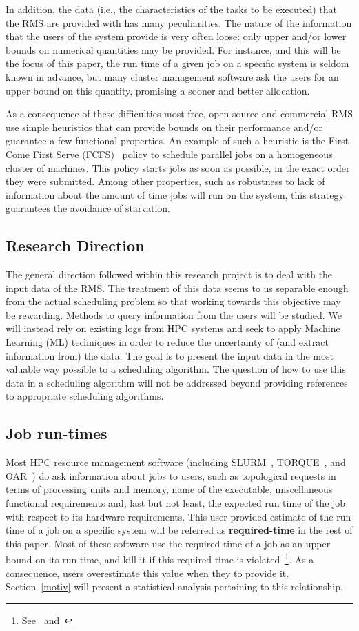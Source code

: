 \documentclass{article}
\begin{document}
In addition, the data (i.e., the characteristics of the tasks to be executed) that the RMS are provided with has many peculiarities.
The nature of the information that the users of the system provide is very often loose: only upper and/or lower bounds on numerical quantities may be provided.
For instance, and this will be the focus of this paper, the run time of a given job on a specific system is seldom known in advance, but many cluster management software ask the users for an upper bound on this quantity, promising a sooner and better allocation.

As a consequence of these difficulties most free, open-source and commercial RMS use simple heuristics that can provide bounds on their performance and/or guarantee a few functional properties.
An example of such a heuristic is the First Come First Serve (FCFS)~\cite{FCFS} policy to schedule parallel jobs on a homogeneous cluster of machines. This policy starts jobs as soon as possible, in the exact order they were submitted.
Among other properties, such as robustness to lack of information about the amount of time jobs will run on the system, this strategy guarantees the avoidance of starvation.

\subsection{Research Direction}
The general direction followed within this research project is to deal with the input data of the RMS.
The treatment of this data seems to us separable enough from the actual scheduling problem so that working towards this objective may be rewarding.
Methods to query information from the users will be studied. We will instead rely on existing logs from HPC systems and seek to apply Machine Learning (ML) techniques in order to reduce the uncertainty of (and extract information from) the data.
The goal is to present the input data in the most valuable way possible to a scheduling algorithm. The question of how to use this data in a scheduling algorithm will not be addressed beyond providing references to appropriate scheduling algorithms.

\subsection{Job run-times}
Most HPC resource management software (including SLURM~\cite{SLURM}, TORQUE~\cite{TORQUE}, and OAR~\cite{OAR}) do ask information about jobs to users, such as topological requests in terms of processing units and memory, name of the executable, miscellaneous functional requirements and, last but not least, the expected run time of the job with respect to its hardware requirements.
This user-provided estimate of the run time of a job on a specific system will be referred as \textbf{required-time} in the rest of this paper.
Most of these software use the required-time of a job as an upper bound on its run time, and kill it if this required-time is violated~\footnote{See~\cite{SLURM} and~\cite{OAR}}.
As a consequence, users overestimate this value when they to provide it. Section~\ref{motiv} will present a statistical analysis pertaining to this relationship.
\end{document}
